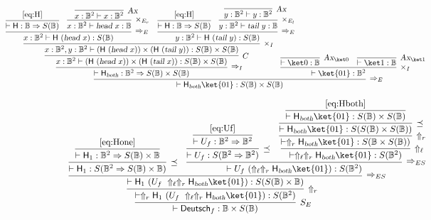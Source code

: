 \documentclass[preprint]{elsarticle}
\newcommand\B{\ensuremath{\mathbb B}}
\newcommand\s[1]{\ensuremath{\mathsf{#1}}}
\newcommand\head{\text{\sl head}}
\newcommand\tail{\text{\sl tail}}
\newcommand\tax{\textsl{Ax}}
\begin{document}
\begin{equation}
  \label{eq:Hboth}
  \hspace{-2.8cm}\infer[\Rightarrow_E]
  {\vdash \s H_{\textsl{both}}\ket{01}: S(\B)\times S(\B)}
  {
    \infer[\Rightarrow_I]
    {\vdash \s H_{\textsl{both}}:\B^2\Rightarrow S(\B)\times S(\B)}
    {
      \infer[C]
      {x:\B^2\vdash(\s H\ (\head\ x))\times(\s H\ (\tail\ x)):S(\B)\times S(\B)}
      {  
        \infer[\times_I]
        {x:\B^2,y:\B^2\vdash(\s H\ (\head\ x))\times(\s H\ (\tail\ y)):S(\B)\times S(\B)}
        {
          \infer[\Rightarrow_E]
          {x:\B^2\vdash \s H\ (\head\ x):S(\B)}
          {
            \infer{\vdash \s H:\B\Rightarrow S(\B)}{\eqref{eq:H}}
            &
            \infer[\times_{E_r}]
            {x:\B^2\vdash\head\ x:\B}
            {\infer[\tax]{x:\B^2\vdash x:\B^2}{}}
          }
          &
          \infer[\Rightarrow_E]
          {y:\B^2\vdash \s H\ (\tail\ y):S(\B)}
          {
            \infer{\vdash \s H:\B\Rightarrow S(\B)}{\eqref{eq:H}}
            &
            \infer[\times_{E_l}]
            {y:\B^2\vdash\tail\ y:\B}
            {\infer[\tax]{y:\B^2\vdash y:\B^2}{}}
          }
        }
      }
    }
    &
    \hspace{-1cm}\infer[\times_I]
    {\vdash\ket{01}:\B^2}
    {
      \infer[\tax_{\ket 0}]
      {\vdash\ket 0:\B}{}
      &
      \infer[\tax_{\ket 1}]
      {\vdash\ket 1:\B}{}
    }
  }
\end{equation}

\[
  \infer[S_E]
  {\vdash \s{Deutsch}_f:\B\times S(\B)}
  {
    \infer[\Uparrow_r]
    {\vdash \Uparrow_r\s H_1\ (U_f\ \Uparrow_\ell\Uparrow_r \s
      H_{\textsl{both}}\ket{01}): S(\B^2)}
    {
      {
        \infer[\Rightarrow_{ES}]
        {\vdash \s H_1\ (U_f\ \Uparrow_\ell\Uparrow_r \s
          H_{\textsl{both}}\ket{01}): S(S(\B)\times\B)}
        {
          \infer[\preceq]
          {\vdash \s H_1:S(\B^2\Rightarrow S(\B)\times\B)}
          {
            \infer{\vdash \s H_1:\B^2\Rightarrow S(\B)\times\B}{\eqref{eq:Hone}}
          }
          &
          \infer[\Rightarrow_{ES}]
          {\vdash U_f\ (\Uparrow_\ell\Uparrow_r \s H_{\textsl{both}}\ket{01}):
            S(\B^2)}
          {
            \infer[\preceq]
            {\vdash U_f:S(\B^2\Rightarrow\B^2)}
            {
              \infer{\vdash U_f:\B^2\Rightarrow\B^2}{\eqref{eq:Uf}}
            }
            &
            \infer[\Uparrow_\ell]
            {\vdash\Uparrow_\ell\Uparrow_r \s H_{\textsl{both}}\ket{01}:S({\B^2})}
            {
              \infer[\Uparrow_r]
              {\vdash\Uparrow_r \s
                H_{\textsl{both}}\ket{01}:S({\B\times S(\B)})}
              {
                \infer[\preceq]
                {\vdash \s H_{\textsl{both}}\ket{01}:S(S(\B)\times S(\B))}
                {
                  \infer
                  {\vdash \s H_{\textsl{both}}\ket{01}:S(\B)\times S(\B)}
                  {\eqref{eq:Hboth}}
                }
              }
            }
          }
        }
      }
    }
  }
\]
\end{document}
